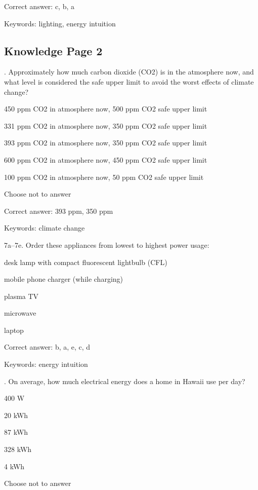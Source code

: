 Correct answer: c, b, a

Keywords: lighting, energy intuition


\subsection{Knowledge Page 2}

. Approximately how much carbon dioxide (CO2) is in the atmosphere now, and what level is considered the safe upper limit to avoid the worst effects of climate change?

\begin{answer}
	\item 450 ppm CO2 in atmosphere now, 500 ppm CO2 safe upper limit
	\item 331 ppm CO2 in atmosphere now, 350 ppm CO2 safe upper limit
	\item 393 ppm CO2 in atmosphere now, 350 ppm CO2 safe upper limit
	\item 600 ppm CO2 in atmosphere now, 450 ppm CO2 safe upper limit
	\item 100 ppm CO2 in atmosphere now, 50 ppm CO2 safe upper limit
	\item Choose not to answer
\end{answer}

Correct answer: 393 ppm, 350 ppm

Keywords: climate change

\vspace{5 mm}
\noindent
7a--7e. Order these appliances from lowest to highest power usage:

\begin{answer}
	\item desk lamp with compact fluorescent lightbulb (CFL)
	\item mobile phone charger (while charging)
	\item plasma TV
	\item microwave
	\item laptop
\end{answer}

Correct answer: b, a, e, c, d

Keywords: energy intuition

\vspace{5 mm}
. On average, how much electrical energy does a home in Hawaii use per day?

\begin{answer}
	\item 400 W
	\item 20 kWh
	\item 87 kWh
	\item 328 kWh
	\item 4 kWh
	\item Choose not to answer
\end{answer}

